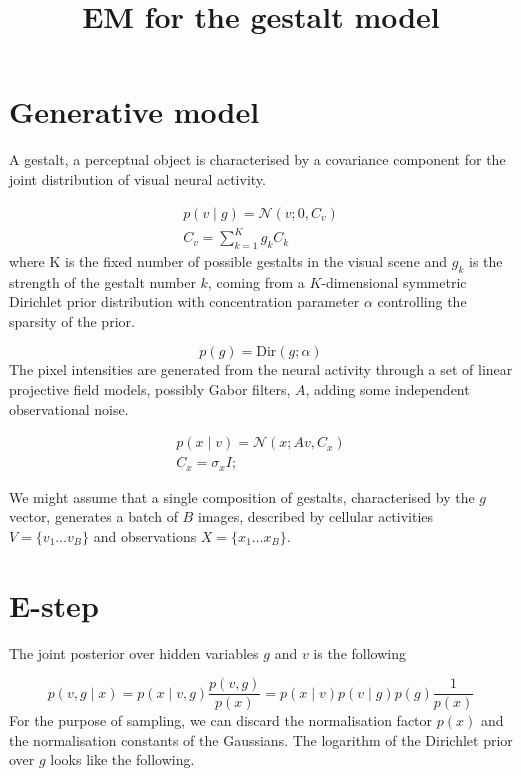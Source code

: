 \documentclass{paper}
\begin{document}
\title{EM for the gestalt model}
\maketitle

\section{Generative model}

A gestalt, a perceptual object is characterised by a covariance component for the joint distribution of visual neural activity. 

\begin{eqnarray}
p(v \mid g) = \mathcal{N}(v; 0,C_v) \\
C_v = \sum_{k=1}^K g_k C_k \label{eq:cv}
\end{eqnarray}
%
where K is the fixed number of possible gestalts in the visual scene and $g_k$ is the strength of the gestalt number $k$, coming from a $K$-dimensional symmetric Dirichlet prior distribution with concentration parameter $\alpha$ controlling the sparsity of the prior.

\begin{equation}
p(g) = \textrm{Dir}(g; \alpha)
\end{equation}
%
The pixel intensities are generated from the neural activity through a set of linear projective field models, possibly Gabor filters, $A$, adding some independent observational noise.

\begin{eqnarray}
p(x \mid v) = \mathcal{N}(x; Av,C_x) \\
C_x = \sigma_x I;
\end{eqnarray}

We might assume that a single composition of gestalts, characterised by the $g$ vector, generates a batch of $B$ images, described by cellular activities $V = \lbrace v_1 \dots v_B \rbrace$ and observations $X = \lbrace x_1 \dots x_B \rbrace$. 

\section{E-step}

The joint posterior over hidden variables $g$ and $v$ is the following

\begin{equation}
p(v,g \mid x) = p(x \mid v,g) \frac{p(v,g)}{p(x)} = p(x \mid v) p(v \mid g) p(g)\frac{1}{p(x)}
\end{equation}
%
For the purpose of sampling, we can discard the normalisation factor $p(x)$ and the normalisation constants of the Gaussians. The logarithm of the Dirichlet prior over $g$ looks like the following. 
\end{document}
